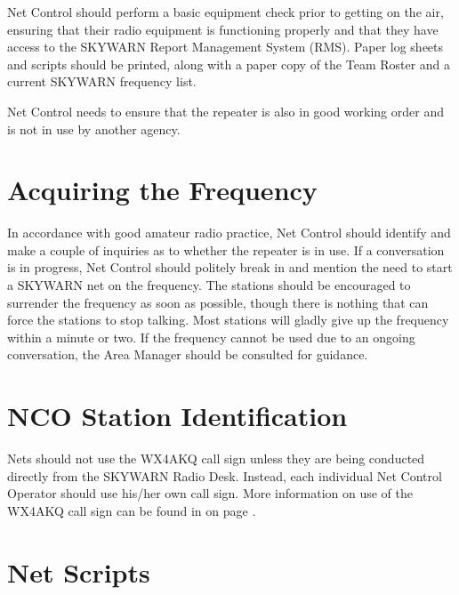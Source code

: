 \documentclass[pdflatex,letterpaper,twoside,12pt]{book}
\begin{document}
Net Control should perform a basic equipment check prior to getting on the air, ensuring that their radio equipment is functioning properly and that they have access to the SKYWARN Report Management System (RMS).  Paper log sheets and scripts should be printed, along with a paper copy of the Team Roster and a current SKYWARN frequency list.

Net Control needs to ensure that the repeater is also in good working order and is not in use by another agency. 


\section{Acquiring the Frequency}

In accordance with good amateur radio practice, Net Control should identify and make a couple of inquiries as to whether the repeater is in use.  If a conversation is in progress, Net Control should politely break in and mention the need to start a SKYWARN net on the frequency.  The stations should be encouraged to surrender the frequency as soon as possible, though there is nothing that can force the stations to stop talking.  Most stations will gladly give up the frequency within a minute or two.  If the frequency cannot be used due to an ongoing conversation, the Area Manager should be consulted for guidance.


\section{NCO Station Identification}\label{nco-station-id}

Nets should not use the WX4AKQ call sign unless they are being conducted directly from the SKYWARN Radio Desk.  Instead, each individual Net Control Operator should use his/her own call sign. More information on use of the WX4AKQ call sign can be found in  on page \pageref{wx4akq-usage}.


\section{Net Scripts}\label{scripts}
\end{document}
